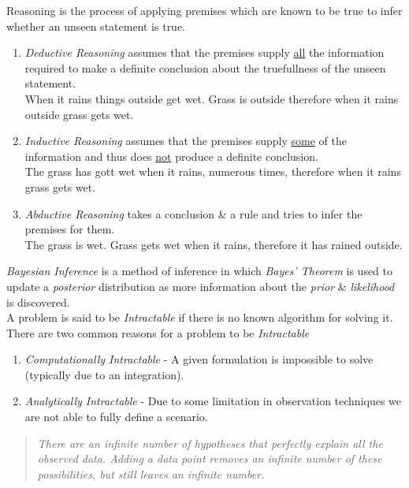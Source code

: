 \documentclass[11pt,a4paper]{article}
\begin{document}
Reasoning is the process of applying premises which are known to be true to infer whether an unseen statement is true. 
\begin{enumerate}
	\item \textit{Deductive Reasoning} assumes that the premises supply \underline{all} the information required to make a definite conclusion about the truefullness of the unseen statement.\\
	\eg When it rains things outside get wet. Grass is outside therefore when it rains outside grass gets wet.
	\item \textit{Inductive Reasoning} assumes that the premises supply \underline{some} of the information and thus does \underline{not} produce a definite conclusion.\\
	\eg The grass has gott wet when it rains, numerous times, therefore when it rains grass gets wet.
	\item \textit{Abductive Reasoning} takes a conclusion \& a rule and tries to infer the premises for them.\\
	\eg The grass is wet. Grass gets wet when it rains, therefore it has rained outside.
\end{enumerate}

\textit{Bayesian Inference} is a method of inference in which \textit{Bayes' Theorem} is used to update a \textit{posterior} distribution as more information about the \textit{prior} \& \textit{likelihood} is discovered.\\

A problem is said to be \textit{Intractable} if there is no known algorithm for solving it. There are two common reasons for a problem to be \textit{Intractable}
\begin{enumerate}
	\item \textit{Computationally Intractable} - A given formulation is impossible to solve (typically due to an integration).
	\item \textit{Analytically Intractable} - Due to some limitation in observation techniques we are not able to fully define a scenario.
\end{enumerate}

\begin{quotation}
\textit{There are an infinite number of hypotheses that perfectly explain all the observed data. Adding a data point removes an infinite number of these possibilities, but still leaves an infinite number.}
\end{quotation}
\end{document}
